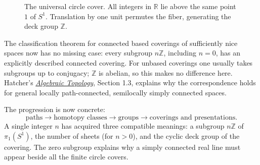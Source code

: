 \begin{figure}[H]
\centering
{}
\caption{The universal circle cover. All integers in $\mathbb R$ lie above the same point $1$ of $S^1$. Translation by one unit permutes the fiber, generating the deck group $\mathbb Z$.}
\end{figure}

The classification theorem for connected based coverings of sufficiently nice spaces now has no missing case: every subgroup $n\mathbb Z$, including $n=0$, has an explicitly described connected covering. For unbased coverings one usually takes subgroups up to conjugacy; $\mathbb Z$ is abelian, so this makes no difference here. Hatcher's \href{https://pi.math.cornell.edu/~hatcher/AT/AT-doublepage.pdf}{\emph{Algebraic Topology}}, Section 1.3, explains why the correspondence holds for general locally path-connected, semilocally simply connected spaces.

The progression is now concrete:
\[
 \text{paths}\longrightarrow\text{homotopy classes}
 \longrightarrow\text{groups}
 \longrightarrow\text{coverings and presentations}.
\]
A single integer $n$ has acquired three compatible meanings: a subgroup $n\mathbb Z$ of $\pi_1(S^1)$, the number of sheets (for $n>0$), and the cyclic deck group of the covering. The zero subgroup explains why a simply connected real line must appear beside all the finite circle covers.
